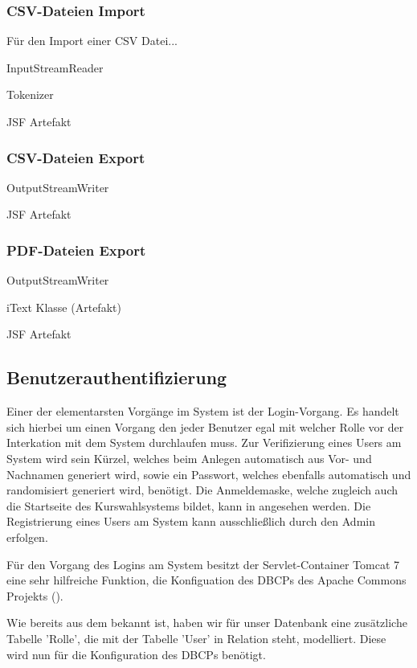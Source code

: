 \subsubsection{CSV-Dateien Import}

Für den Import einer CSV Datei...

	InputStreamReader
	
	Tokenizer
	
	JSF Artefakt

\subsubsection{CSV-Dateien Export}

	OutputStreamWriter
	
	JSF Artefakt

\subsubsection{PDF-Dateien Export}

	OutputStreamWriter
	
	iText Klasse (Artefakt)
	
	JSF Artefakt


\subsection{Benutzerauthentifizierung}

Einer der elementarsten Vorgänge im System ist der Login-Vorgang. Es handelt sich hierbei um einen Vorgang den jeder Benutzer egal mit welcher Rolle vor der Interkation mit dem System durchlaufen muss. Zur Verifizierung eines Users am System wird sein Kürzel, welches beim Anlegen automatisch aus Vor- und Nachnamen generiert wird, sowie ein Passwort, welches ebenfalls automatisch und randomisiert generiert wird, benötigt. Die Anmeldemaske, welche zugleich auch die Startseite des Kurswahlsystems bildet, kann in  angesehen werden. Die Registrierung eines Users am System kann ausschließlich durch den Admin erfolgen.

Für den Vorgang des Logins am System besitzt der Servlet-Container Tomcat 7 eine sehr hilfreiche Funktion, die Konfiguation des \ac{DBCP}s des Apache Commons Projekts (\cite{tomcatDBCP}). 

Wie bereits aus dem  bekannt ist, haben wir für unser Datenbank eine zusätzliche Tabelle 'Rolle', die mit der Tabelle 'User' in Relation steht, modelliert. Diese wird nun für die Konfiguration des \ac{DBCP}s benötigt.

